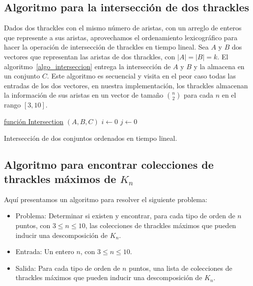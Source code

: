 \subsection{Algoritmo para la intersección de dos thrackles}\label{secc:algo_interseccion_thrackles}
  Dados dos thrackles con el mismo número de aristas, con un arreglo de enteros que
  represente a sus aristas, aprovechamos el ordenamiento lexicográfico para hacer la
  operación de intersección de thrackles en tiempo lineal.
  Sea $A$ y $B$ dos vectores que representan las aristas de dos thrackles, con
  $|A|=|B|=k$. El algoritmo~\ref{algo_interseccion} entrega la intersección de $A$ y $B$
  y la almacena en un conjunto $C$. Este algoritmo es secuencial y visita en el peor caso
  todas las entradas de los dos vectores, en nuestra implementación, los thrackles
  almacenan la información de sus aristas en un vector de tamaño $\binom{n}{2}$ para cada
  $n$ en el rango $[3,10]$.
  \begin{algorithm}[ht]
    \DontPrintSemicolon
    \underline{función Intersection} $(A,B,C)$\;
      $i\gets 0$\;
      $j\gets 0$\;
    \caption{Intersección de dos conjuntos ordenados en tiempo
    lineal.}
    \label{algo_interseccion}
  \end{algorithm}

\subsection{Algoritmo para encontrar colecciones de thrackles máximos de $K_n$} \label{secc:algo_descomposicion_thrackles_maximos}
  Aquí presentamos un algoritmo para resolver el siguiente problema:
  \begin{itemize}
    \item[] Problema: Determinar si existen y encontrar, para cada tipo de orden de $n$ puntos, con $3 \leq n \leq 10$, las colecciones de thrackles máximos que pueden inducir una descomposición de $K_n$.
    \item[] Entrada: Un entero $n$, con $ 3 \leq n \leq 10$.
    \item[] Salida: Para cada tipo de orden de $n$ puntos, una lista de colecciones de thrackles máximos que pueden inducir una descomposición de $K_n$.
  \end{itemize}

